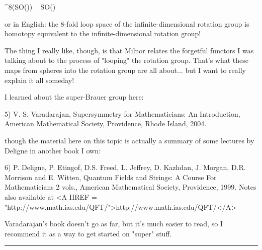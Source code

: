 \Omega ^{8}(SO(\infty )) ~ SO(\infty )

or in English: the 8-fold loop space of the infinite-dimensional rotation
group is homotopy equivalent to the infinite-dimensional rotation group!

The thing I really like, though, is that Milnor relates the forgetful functors
I was talking about to the process of "looping" the rotation group.  That's
what these maps from spheres into the rotation group are all about... but I 
want to really explain it all someday!

I learned about the super-Brauer group here:

5) V. S. Varadarajan, Supersymmetry for Mathematicians: An Introduction,
American Mathematical Society, Providence, Rhode Island, 2004.

though the material here on this topic is actually a summary of some
lectures by Deligne in another book I own:

6) P. Deligne, P. Etingof, D.S. Freed, L. Jeffrey, D. Kazhdan, J. Morgan, D.R. 
Morrison and E. Witten, Quantum Fields and Strings: A Course For Mathematicians 
2 vols., American Mathematical Society, Providence, 1999.  Notes also available
at <A HREF = "http://www.math.ias.edu/QFT/">http://www.math.ias.edu/QFT/</A>

Varadarajan's book doesn't go as far, but it's much easier to read, so I 
recommend it as a way to get started on "super" stuff.


\par\noindent\rule{\textwidth}{0.4pt}


